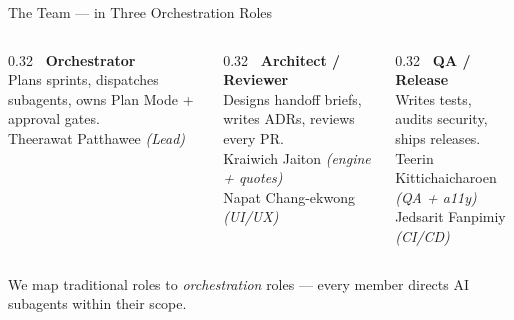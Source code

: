 \documentclass[aspectratio=169,11pt]{beamer}
\providecommand{\faMicrochip}{}
\providecommand{\faProjectDiagram}{}
\providecommand{\faShieldAlt}{}
\begin{document}
\begin{frame}{The Team --- in Three Orchestration Roles}
\begin{columns}[T,onlytextwidth]
  \begin{column}{0.32\textwidth}
    \textbf{\color{moodgreen}\faMicrochip\ Orchestrator}\\[0.3em]
    Plans sprints, dispatches subagents, owns Plan Mode + approval gates.\\[0.6em]
    \small Theerawat Patthawee \textit{(Lead)}
  \end{column}
  \begin{column}{0.32\textwidth}
    \textbf{\color{moodorange}\faProjectDiagram\ Architect / Reviewer}\\[0.3em]
    Designs handoff briefs, writes ADRs, reviews every PR.\\[0.6em]
    \small Kraiwich Jaiton \textit{(engine + quotes)}\\ Napat Chang-ekwong \textit{(UI/UX)}
  \end{column}
  \begin{column}{0.32\textwidth}
    \textbf{\color{moodred}\faShieldAlt\ QA / Release}\\[0.3em]
    Writes tests, audits security, ships releases.\\[0.6em]
    \small Teerin Kittichaicharoen \textit{(QA + a11y)}\\ Jedsarit Fanpimiy \textit{(CI/CD)}
  \end{column}
\end{columns}
\vfill
{\footnotesize\color{gray!70} We map traditional roles to \emph{orchestration} roles --- every member directs AI subagents within their scope.}
\end{frame}

\end{document}

